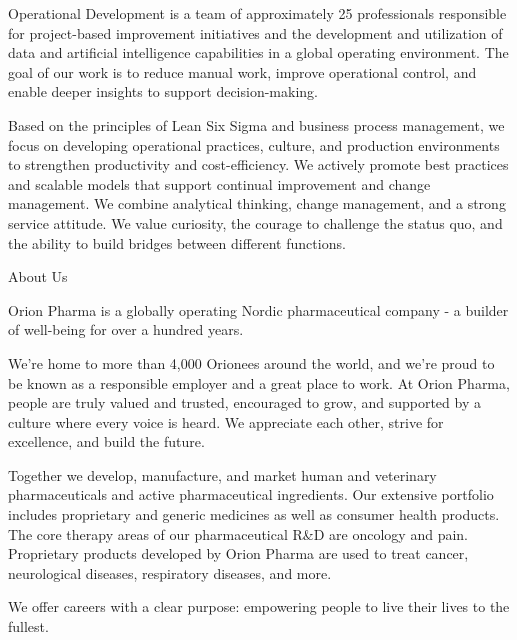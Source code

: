 \documentclass[a4paper,11pt]{article}
\begin{document}
Operational Development is a team of approximately 25 professionals responsible for project-based improvement initiatives and the development and utilization of data and artificial intelligence capabilities in a global operating environment. The goal of our work is to reduce manual work, improve operational control, and enable deeper insights to support decision-making.

Based on the principles of Lean Six Sigma and business process management, we focus on developing operational practices, culture, and production environments to strengthen productivity and cost-efficiency. We actively promote best practices and scalable models that support continual improvement and change management. We combine analytical thinking, change management, and a strong service attitude. We value curiosity, the courage to challenge the status quo, and the ability to build bridges between different functions.

About Us

Orion Pharma is a globally operating Nordic pharmaceutical company - a builder of well-being for over a hundred years.

We're home to more than 4,000 Orionees around the world, and we're proud to be known as a responsible employer and a great place to work. At Orion Pharma, people are truly valued and trusted, encouraged to grow, and supported by a culture where every voice is heard. We appreciate each other, strive for excellence, and build the future.

Together we develop, manufacture, and market human and veterinary pharmaceuticals and active pharmaceutical ingredients. Our extensive portfolio includes proprietary and generic medicines as well as consumer health products. The core therapy areas of our pharmaceutical R&D are oncology and pain. Proprietary products developed by Orion Pharma are used to treat cancer, neurological diseases, respiratory diseases, and more.

We offer careers with a clear purpose: empowering people to live their lives to the fullest.
\end{document}
